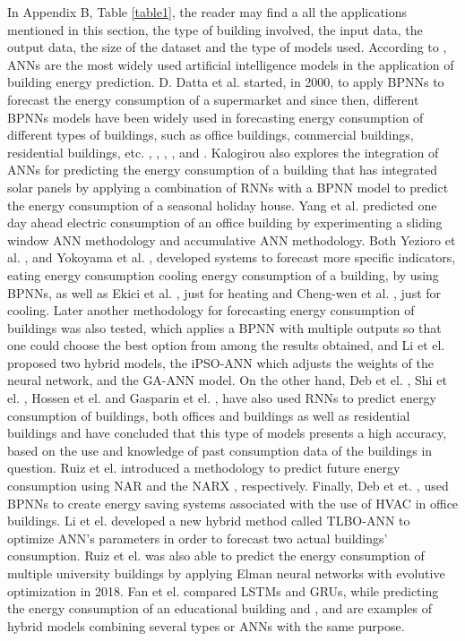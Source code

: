 In Appendix B, Table \ref{table1}, the reader may find a all the applications mentioned in this section, the type of building involved, the input data, the output data, the size of the dataset and the type of models used. According to \cite{ann1}, \ac{ANNs} are the most widely used artificial intelligence models in the application of building energy prediction. D. Datta et al. \cite{annr1} started, in 2000, to apply \ac{BPNN}s to forecast the energy consumption of a supermarket and since then, different \ac{BPNN}s models have been widely used in forecasting energy consumption of different types of buildings, such as office buildings, commercial buildings, residential buildings, etc. \cite{annr4}, \cite{annr9}, \cite{annr13}, \cite{annr14}, \cite{annr17} and \cite{annr19}. Kalogirou \cite{annr2} also explores the integration of \ac{ANN}s for predicting the energy consumption of a building that has integrated solar panels by applying a combination of \ac{RNN}s with a \ac{BPNN} model to predict the energy consumption of a seasonal holiday house. Yang et al. \cite{annr3} predicted one day ahead electric consumption of an office building by experimenting a sliding window \ac{ANN} methodology and accumulative \ac{ANN} methodology. Both Yezioro et al. \cite{annr5}, and Yokoyama et al. \cite{annr7}, developed systems to forecast more specific indicators, eating energy consumption cooling energy consumption of a building, by using \ac{BPNN}s, as well as Ekici et al. \cite{annr6}, just for heating and Cheng-wen et al. \cite{annr8}, just for cooling. Later another methodology for forecasting energy consumption of buildings was also tested, which applies a \ac{BPNN} with multiple outputs \cite{annr10} so that one could choose the best option from among the results obtained, and Li et el.\cite{annr12} proposed two hybrid models, the \ac{iPSO-ANN} which adjusts the weights of the neural network, and the \ac{GA-ANN} model.
On the other hand, Deb et el. \cite{annr15}, Shi et el. \cite{annr16}, Hossen et el. \cite{annr18} and Gasparin et el. \cite{annr21},  have also used \ac{RNN}s to predict energy consumption of buildings, both offices and buildings as well as residential buildings and have concluded that this type of models presents a high accuracy, based on the use and knowledge of past consumption data of the buildings in question. Ruiz et el. \cite{annr22} introduced a methodology to predict future energy consumption using \ac{NAR} and the \ac{NARX} , respectively.
Finally, Deb et et. \cite{annr20}, used \ac{BPNN}s to create energy saving systems associated with the use of \ac{HVAC} in office buildings.
Li et el. \cite{annr24} developed a new hybrid method called \ac{TLBO-ANN} to optimize \ac{ANN}’s parameters in order to forecast two actual buildings' consumption. Ruiz et el. \cite{annr25} was also able to predict the energy consumption of multiple university buildings by applying Elman neural networks with evolutive optimization in 2018. Fan et el. \cite{annr26} compared \ac{LSTM}s and \ac{GRU}s, while predicting the energy consumption of an educational building and \cite{annr27}, \cite{annr28} and \cite{annr29} are examples of hybrid models combining several types or \ac{ANN}s with the same purpose. 


